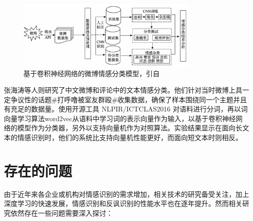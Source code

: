 \begin{figure}[H] %
  \centering
  \includegraphics[width=0.8\textwidth]{img/zhang2018jiyu.png}
  \caption{基于卷积神经网络的微博情感分类模型，引自\cite{zhang2018jiyu}}
  \label{fig:zhang2018jiyu}
\end{figure}

张海涛等人\cite{zhang2018jiyu}则研究了中文微博和评论中的文本情感分类。他们针对当时微博上具一定争议性的话题\#打呼噜被室友群殴\#收集数据，确保了样本围绕同一个主题并且有充足的数据量。使用开源工具 NLPIR/ICTCLAS2016 对语料进行分词，再以词向量学习算法word2vec从语料中学习词的表示向量作为输入，以基于卷积神经网络的模型作为分类器，另外以支持向量机作为对照算法。实验结果显示在面向长文本的情感识别时，他们的系统比支持向量机性能更好，而面向短文本时则相反。

\section{存在的问题}

由于近年来各企业或机构对情感识别的需求增加，相关技术的研究备受关注，加上深度学习的快速发展，情感识别和反讽识别的性能水平也在逐年提升。然而相关研究依然存在一些问题需要深入探讨：


